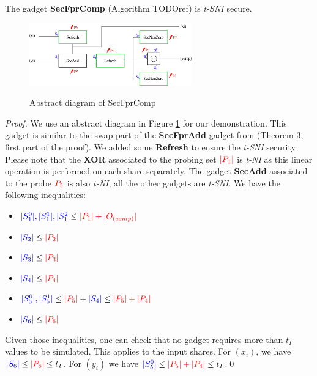 \documentclass[runningheads]{llncs}
\begin{document}
\begin{lemma}\label{lemma:secfprcomp}
  The gadget \textbf{SecFprComp} (Algorithm TODOref{}) is \emph{t-SNI} secure.
\end{lemma}
\begin{figure}[ht]
  \centering
  \includegraphics[width=7cm]{definitive scheme/SecFprInv/secfprcomp.pdf}
  \label{fig:secfprcomp}
  \caption{Abstract diagram of SecFprComp}
\end{figure}
\begin{proof}
  We use an abstract diagram in Figure \ref{fig:secfprcomp} for our demonstration. This gadget is similar to the swap part of the \textbf{SecFprAdd} gadget from \cite{Chen_Chen_2024} (Theorem 3, first part of the proof). We added some \textbf{Refresh} to ensure the \emph{t-SNI} security. Please note that the \textbf{XOR} associated to the probing set $\textcolor{red}{|P_1|}$ is \emph{t-NI} as this linear operation is performed on each share separately. The gadget \textbf{SecAdd} associated to the probe $\textcolor{red}{P_5}$ is also \emph{t-NI}, all the other gadgets are \emph{t-SNI}. We have the following inequalities:
  \begin{multicols}{2}
    \begin{itemize}
      \item $\textcolor{blue}{|S_1^0|,|S_1^1|,|S_1^2} \leq \textcolor{red}{|P_1| +|O_{(comp)}|}$
      \item $\textcolor{blue}{|S_2|} \leq \textcolor{red}{|P_2|} $
      \item $\textcolor{blue}{|S_3|} \leq \textcolor{red}{|P_3|}$
      \item $\textcolor{blue}{|S_4|} \leq \textcolor{red}{|P_4|}$
      \item $\textcolor{blue}{|S_5^0|,|S_5^1|} \leq \textcolor{red}{|P_5|} + \textcolor{blue}{|S_4|} \leq \textcolor{red}{|P_5| + |P_4|}$
      \item $\textcolor{blue}{|S_6|} \leq \textcolor{red}{|P_6|}$
    \end{itemize}
  \end{multicols}
  Given those inequalities, one can check that no gadget requires more than $t_I$ values to be simulated. This applies to the input shares. For $(x_i)$, we have $\textcolor{blue}{|S_6|} \leq \textcolor{red}{|P_6|} \leq t_I$. For $(y_i)$ we have $\textcolor{blue}{|S_5^0|} \leq \textcolor{red}{|P_5| + |P_4|} \leq t_I$.\hfill \qed
\end{proof}
\end{document}
